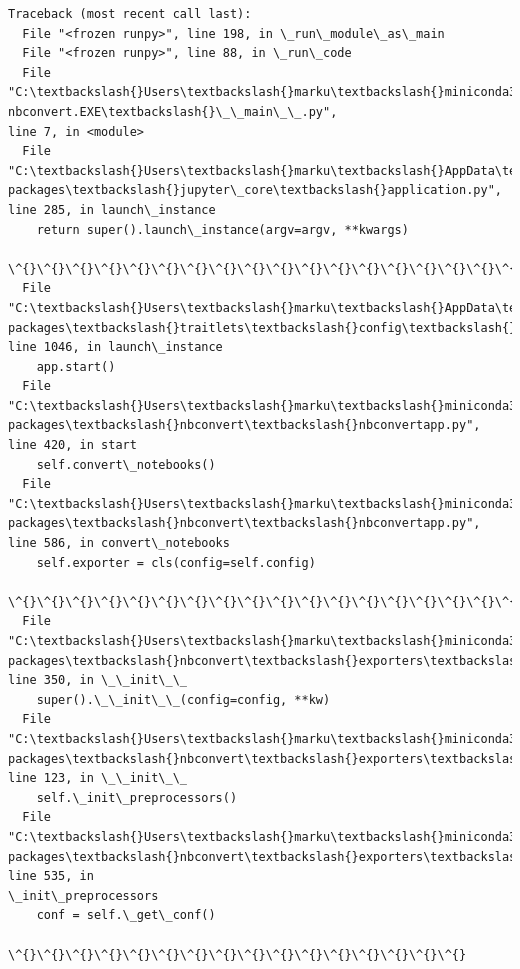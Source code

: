 \documentclass[11pt]{article}
\begin{document}
\begin{Verbatim}[commandchars=\\\{\}]
Traceback (most recent call last):
  File "<frozen runpy>", line 198, in \_run\_module\_as\_main
  File "<frozen runpy>", line 88, in \_run\_code
  File "C:\textbackslash{}Users\textbackslash{}marku\textbackslash{}miniconda3\textbackslash{}Scripts\textbackslash{}jupyter-nbconvert.EXE\textbackslash{}\_\_main\_\_.py",
line 7, in <module>
  File "C:\textbackslash{}Users\textbackslash{}marku\textbackslash{}AppData\textbackslash{}Roaming\textbackslash{}Python\textbackslash{}Python311\textbackslash{}site-
packages\textbackslash{}jupyter\_core\textbackslash{}application.py", line 285, in launch\_instance
    return super().launch\_instance(argv=argv, **kwargs)
           \^{}\^{}\^{}\^{}\^{}\^{}\^{}\^{}\^{}\^{}\^{}\^{}\^{}\^{}\^{}\^{}\^{}\^{}\^{}\^{}\^{}\^{}\^{}\^{}\^{}\^{}\^{}\^{}\^{}\^{}\^{}\^{}\^{}\^{}\^{}\^{}\^{}\^{}\^{}\^{}\^{}\^{}\^{}\^{}
  File "C:\textbackslash{}Users\textbackslash{}marku\textbackslash{}AppData\textbackslash{}Roaming\textbackslash{}Python\textbackslash{}Python311\textbackslash{}site-
packages\textbackslash{}traitlets\textbackslash{}config\textbackslash{}application.py", line 1046, in launch\_instance
    app.start()
  File "C:\textbackslash{}Users\textbackslash{}marku\textbackslash{}miniconda3\textbackslash{}Lib\textbackslash{}site-packages\textbackslash{}nbconvert\textbackslash{}nbconvertapp.py",
line 420, in start
    self.convert\_notebooks()
  File "C:\textbackslash{}Users\textbackslash{}marku\textbackslash{}miniconda3\textbackslash{}Lib\textbackslash{}site-packages\textbackslash{}nbconvert\textbackslash{}nbconvertapp.py",
line 586, in convert\_notebooks
    self.exporter = cls(config=self.config)
                    \^{}\^{}\^{}\^{}\^{}\^{}\^{}\^{}\^{}\^{}\^{}\^{}\^{}\^{}\^{}\^{}\^{}\^{}\^{}\^{}\^{}\^{}\^{}
  File "C:\textbackslash{}Users\textbackslash{}marku\textbackslash{}miniconda3\textbackslash{}Lib\textbackslash{}site-
packages\textbackslash{}nbconvert\textbackslash{}exporters\textbackslash{}templateexporter.py", line 350, in \_\_init\_\_
    super().\_\_init\_\_(config=config, **kw)
  File "C:\textbackslash{}Users\textbackslash{}marku\textbackslash{}miniconda3\textbackslash{}Lib\textbackslash{}site-
packages\textbackslash{}nbconvert\textbackslash{}exporters\textbackslash{}exporter.py", line 123, in \_\_init\_\_
    self.\_init\_preprocessors()
  File "C:\textbackslash{}Users\textbackslash{}marku\textbackslash{}miniconda3\textbackslash{}Lib\textbackslash{}site-
packages\textbackslash{}nbconvert\textbackslash{}exporters\textbackslash{}templateexporter.py", line 535, in
\_init\_preprocessors
    conf = self.\_get\_conf()
           \^{}\^{}\^{}\^{}\^{}\^{}\^{}\^{}\^{}\^{}\^{}\^{}\^{}\^{}\^{}\^{}

\end{Verbatim}
\end{document}
